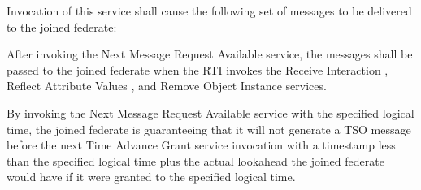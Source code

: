 \begin{compactstdpage}

    Invocation of this service shall cause the following set of messages to be delivered to the joined federate:


    After invoking the Next Message Request Available service, the messages shall be passed to the joined federate when the RTI invokes the Receive Interaction \rtiinitiated{}, Reflect Attribute Values \rtiinitiated{}, and Remove Object Instance \rtiinitiated{} services.

    By invoking the Next Message Request Available service with the specified logical time, the joined federate is guaranteeing that it will not generate a TSO message before the next Time Advance Grant \rtiinitiated{} service invocation with a timestamp less than the specified logical time plus the actual lookahead the joined federate would have if it were granted to the specified logical time.


\end{compactstdpage}

\clearpage

